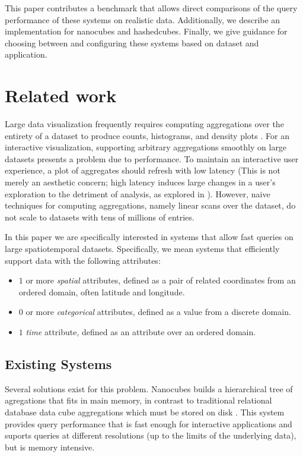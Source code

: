 \documentclass[journal]{vgtc}                %
\begin{document}
{This paper contributes a benchmark that allows direct comparisons of the query
performance of these systems on realistic data. Additionally, we describe an
implementation for nanocubes and hashedcubes. Finally, we
give guidance for choosing between and configuring these systems based on
dataset and application.


\section{Related work}

Large data visualization frequently requires computing aggregations over the
entirety of a dataset to produce counts, histograms, and density plots
\cite{?}. For an interactive visualization, supporting arbitrary aggregations
smoothly on large datasets presents a problem due to performance. To maintain
an interactive user experience, a plot of aggregates should refresh with low
latency (This is not merely an aesthetic concern; high latency induces large
changes in a user's exploration to the detriment of analysis, as explored in
\cite{2014-latency} ). However, naive techniques
for computing aggregations, namely linear scans over the dataset, do not scale
to datasets with tens of millions of entries.

In this paper we are specifically interested in systems that allow fast queries on large spatiotemporal datasets. Specifically, we mean systems that efficiently support data with the following attributes:

\begin{itemize}
	\item $1$ or more \textit{spatial} attributes, defined as a pair of related coordinates from an ordered domain, often latitude and longitude.
	\item $0$ or more \textit{categorical} attributes, defined as a value from a discrete domain.
	\item $1$ \textit{time} attribute, defined as an attribute over an ordered domain.
\end{itemize}

\subsection{Existing Systems}

Several solutions exist for this problem. Nanocubes builds a
hierarchical tree of agregations that fits in main memory, in contrast to
traditional relational database data cube aggregations which must be stored on
disk \cite{nanocubes}. This system provides query performance that is fast
enough for interactive applications and suports queries at different
resolutions (up to the limits of the underlying data), but is memory intensive.

}
\end{document}
